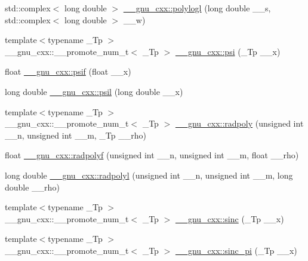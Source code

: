 \begin{DoxyCompactItemize}
\item 
std\+::complex$<$ long double $>$ \hyperlink{group__gnu__math__spec__func_ga9eb79e506eda210610bc59c1912b4d0f}{\+\_\+\+\_\+gnu\+\_\+cxx\+::polylogl} (long double \+\_\+\+\_\+s, std\+::complex$<$ long double $>$ \+\_\+\+\_\+w)
\item 
{\footnotesize template$<$typename \+\_\+\+Tp $>$ }\\\+\_\+\+\_\+gnu\+\_\+cxx\+::\+\_\+\+\_\+promote\+\_\+num\+\_\+t$<$ \+\_\+\+Tp $>$ \hyperlink{group__gnu__math__spec__func_ga850cdad2e428a553e5adf2474a6a385a}{\+\_\+\+\_\+gnu\+\_\+cxx\+::psi} (\+\_\+\+Tp \+\_\+\+\_\+x)
\item 
float \hyperlink{group__gnu__math__spec__func_ga47ae74abfaa3f549eed4a87b1b63449d}{\+\_\+\+\_\+gnu\+\_\+cxx\+::psif} (float \+\_\+\+\_\+x)
\item 
long double \hyperlink{group__gnu__math__spec__func_gaaf230aedcb20a1c5a43fc71132bb0dc1}{\+\_\+\+\_\+gnu\+\_\+cxx\+::psil} (long double \+\_\+\+\_\+x)
\item 
{\footnotesize template$<$typename \+\_\+\+Tp $>$ }\\\+\_\+\+\_\+gnu\+\_\+cxx\+::\+\_\+\+\_\+promote\+\_\+num\+\_\+t$<$ \+\_\+\+Tp $>$ \hyperlink{group__gnu__math__spec__func_ga2a415dff236d6e4c36150bd5958eaf78}{\+\_\+\+\_\+gnu\+\_\+cxx\+::radpoly} (unsigned int \+\_\+\+\_\+n, unsigned int \+\_\+\+\_\+m, \+\_\+\+Tp \+\_\+\+\_\+rho)
\item 
float \hyperlink{group__gnu__math__spec__func_ga8a98d7c7c14f1aadff90123a114fa2c9}{\+\_\+\+\_\+gnu\+\_\+cxx\+::radpolyf} (unsigned int \+\_\+\+\_\+n, unsigned int \+\_\+\+\_\+m, float \+\_\+\+\_\+rho)
\item 
long double \hyperlink{group__gnu__math__spec__func_ga377febebd1096400897170bb7a76cd3a}{\+\_\+\+\_\+gnu\+\_\+cxx\+::radpolyl} (unsigned int \+\_\+\+\_\+n, unsigned int \+\_\+\+\_\+m, long double \+\_\+\+\_\+rho)
\item 
{\footnotesize template$<$typename \+\_\+\+Tp $>$ }\\\+\_\+\+\_\+gnu\+\_\+cxx\+::\+\_\+\+\_\+promote\+\_\+num\+\_\+t$<$ \+\_\+\+Tp $>$ \hyperlink{group__gnu__math__spec__func_gab0697cae10f8981fa700ab81c67a7746}{\+\_\+\+\_\+gnu\+\_\+cxx\+::sinc} (\+\_\+\+Tp \+\_\+\+\_\+x)
\item 
{\footnotesize template$<$typename \+\_\+\+Tp $>$ }\\\+\_\+\+\_\+gnu\+\_\+cxx\+::\+\_\+\+\_\+promote\+\_\+num\+\_\+t$<$ \+\_\+\+Tp $>$ \hyperlink{group__gnu__math__spec__func_gacfca76a0549d5c42394e1597f83414da}{\+\_\+\+\_\+gnu\+\_\+cxx\+::sinc\+\_\+pi} (\+\_\+\+Tp \+\_\+\+\_\+x)

\end{DoxyCompactItemize}
